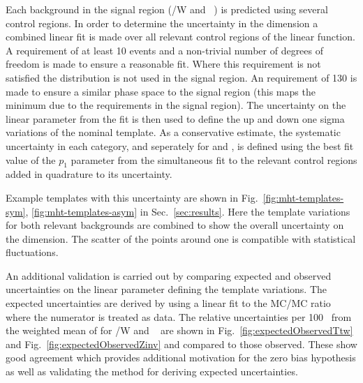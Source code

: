 Each background in the signal region (\ttbar/W  and \zInv~) is predicted 
using several control regions. In order to determine the uncertainty in
the \mht dimension a combined linear fit is made over all relevant control regions
of the linear function. A requirement of at least 10 events and a non-trivial
number of degrees of freedom is made to ensure a reasonable fit. Where this
requirement is not satisfied the \mht distribution is not used in the signal region.
An \mht requirement of 130 \GeV is made to ensure a similar phase space to 
the signal region (this maps the minimum \mht due to the \alt requirements in the signal region).
The uncertainty on the linear parameter from the fit is then
used to define the up and down one sigma variations of the nominal template.
As a conservative estimate, the systematic uncertainty in each category, and seperately
for \zInv and \ttW, is defined using the best fit value of the $p_1$ parameter 
from the simultaneous fit to the relevant control regions
added in quadrature to its uncertainty.

Example templates with this uncertainty are shown in Fig.~\ref{fig:mht-templates-sym}, \ref{fig:mht-templates-asym} 
in Sec.~\ref{sec:results}. Here the template variations for both relevant 
backgrounds are combined to show the overall uncertainty on the \mht dimension. 
The scatter of the points around one is compatible with statistical fluctuations.

An additional validation is carried out by comparing expected and observed uncertainties
on the linear parameter defining the template variations.
The expected uncertainties are derived by using a linear fit to the MC/MC ratio where the numerator
is treated as data. The relative uncertainties per 100 \GeV~from the weighted mean of \mht
for \ttbar/W and \zInv~ are shown in Fig.~\ref{fig:expectedObservedTtw} 
and Fig.~\ref{fig:expectedObservedZinv} and compared to those observed.
These show good agreement which provides additional motivation for the 
zero bias hypothesis as well as validating the method for deriving expected uncertainties.


